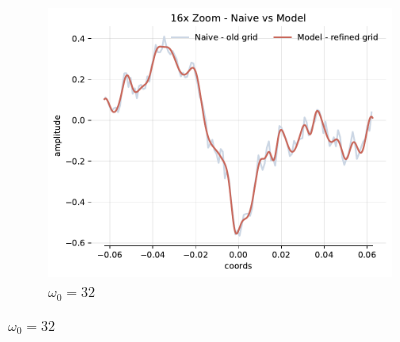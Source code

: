 \begin{figure}[h]
    \begin{subfigure}[b]{0.32\textwidth}
        \centering
        \includegraphics[width=\textwidth]{img/ch4/16x-zoom-1hl-32hf-32hz.pdf}
        \caption{$\omega_0=32$}
        \label{fig:16x-zoom-1hl-32hf-32hz}
    \end{subfigure}


\end{figure}
